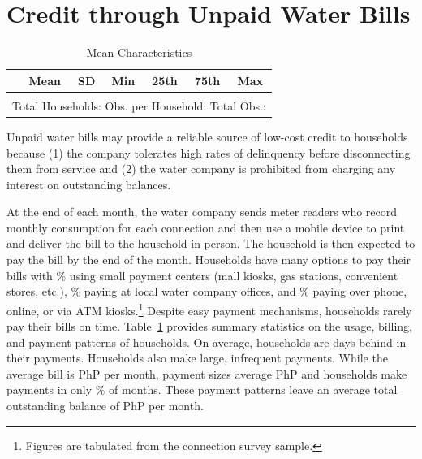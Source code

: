 \documentclass[12pt]{article}
\begin{document}
\section{Credit through Unpaid Water Bills}\label{section:descriptives}



\begin{table}[h!] %
\centering
\caption{Mean Characteristics}\label{table:descriptives_all}
\vspace{-2mm}
\begin{tabular}{l*{1}{cccccc}}
\toprule
 & Mean & SD & Min & 25th & 75th & Max  \\
\midrule

\bottomrule \\ [-.8em]
\multicolumn{7}{c}{Total Households:   Obs. per Household:  Total Obs.: }
\end{tabular}
\end{table}

Unpaid water bills may provide a reliable source of low-cost credit to households because (1) the company tolerates high rates of delinquency before disconnecting them from service and (2) the water company is prohibited from charging any interest on outstanding balances. 

At the end of each month, the water company sends meter readers who record monthly consumption for each connection and then use a mobile device to print and deliver the bill to the household in person.  The household is then expected to pay the bill by the end of the month.  Households have many options to pay their bills with \unskip\% using small payment centers (mall kiosks, gas stations, convenient stores, etc.), \unskip\% paying at local water company offices, and \unskip\% paying over phone, online, or via ATM kiosks.\footnote{Figures are tabulated from the connection survey sample.}  Despite easy payment mechanisms, households rarely pay their bills on time.  Table~\ref{table:descriptives_all} provides summary statistics on the usage, billing, and payment patterns of households.  On average, households are days behind in their payments.  Households also make large, infrequent payments.  While the average bill is PhP per month, payment sizes average PhP and households make payments in only \unskip\% of months.  These payment patterns leave an average total outstanding balance of PhP per month.  
\end{document}
